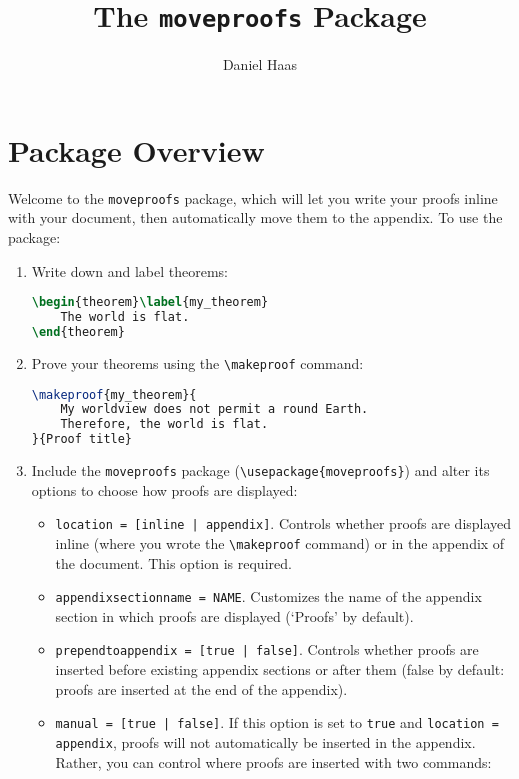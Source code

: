 \documentclass{article}
\title{\vspace{-2.75cm}The \texttt{moveproofs} Package}
\author{Daniel Haas}
\newtheorem{theorem}{Theorem}
\begin{document}
\maketitle

\section{Package Overview}
Welcome to the \texttt{moveproofs} package, which will let you write your proofs inline with your document, then automatically move them to the appendix.
To use the package:
\begin{enumerate}
    \item Write down and label theorems:
\begin{lstlisting}[language=TeX, moretexcs={begin, label}]
\begin{theorem}\label{my_theorem}
    The world is flat.
\end{theorem}
\end{lstlisting}
    \item Prove your theorems using the \texttt{\textbackslash makeproof} command:
\begin{lstlisting}[language=TeX, moretexcs={begin, label, makeproof}]
\makeproof{my_theorem}{
    My worldview does not permit a round Earth.
    Therefore, the world is flat.
}{Proof title}
\end{lstlisting}
    \item Include the \texttt{moveproofs} package (\texttt{\textbackslash usepackage\{moveproofs\}}) and alter its options to choose how proofs are displayed:
        \begin{itemize}
        \item \texttt{location = [inline | appendix]}. Controls whether proofs are displayed inline (where you wrote the \texttt{\textbackslash makeproof} command) or in the appendix of the document. This option is required.
        \item \texttt{appendixsectionname = NAME}. Customizes the name of the appendix section in which proofs are displayed (`Proofs' by default).
        \item \texttt{prependtoappendix = [true | false]}. Controls whether proofs are inserted before existing appendix sections or after them (false by default: proofs are inserted at the end of the appendix).
        \item \texttt{manual = [true | false]}. If this option is set to \texttt{true} and \texttt{location = appendix}, proofs will not automatically be inserted in the appendix. Rather, you can control where proofs are inserted with two commands:

\end{itemize}
\end{enumerate}
\end{document}
